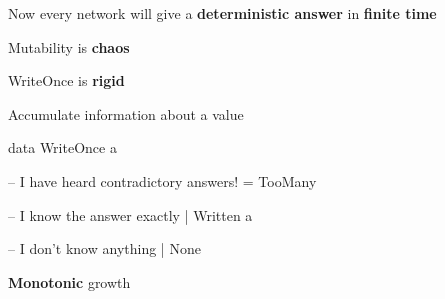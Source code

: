 \documentclass[UKenglish,usenames,dvipsnames,svgnames,table,aspectratio=169,mathserif]{beamer}
\newcommand{\nl}{\vspace{\baselineskip}}
\newcommand{\pnl}{\pause \nl}
\begin{document}
\begin{frame}
\Large

Now every network will give a
{\bf deterministic answer}
in {\bf finite time}
\end{frame}


\begin{frame}

\centering \LARGE

Mutability is {\bf chaos}

\nl
WriteOnce is {\bf rigid}
\end{frame}


\begin{frame}[fragile]
\centering

{\LARGE
Accumulate information about a value}

\end{frame}


\begin{frame}[fragile]

\begin{haskellcode}
data WriteOnce a

  -- I have heard contradictory answers!
  = TooMany

  -- I know the answer exactly
  | Written a

  -- I don't know anything
  | None
\end{haskellcode}

\pnl

\centering \Large
{\bf Monotonic} growth

\end{frame}



\end{document}
